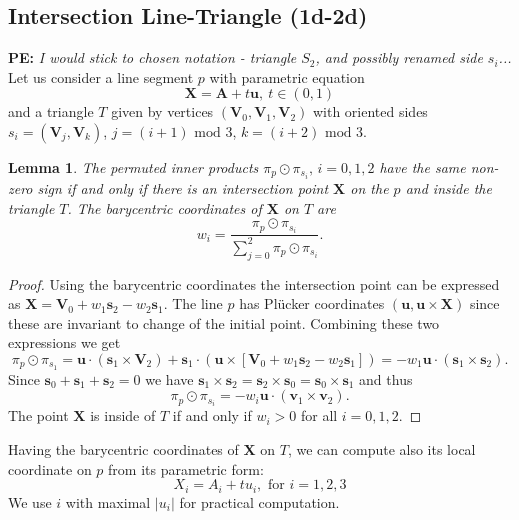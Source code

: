 \documentclass{elsarticle}
\newtheorem{lemma}[theorem]{Lemma}
\def\vc#1{\mathbf{\boldsymbol{#1}}}     %
\newcommand{\notePE}[1]{{\color{Orange} \textbf{PE: } \textit{#1}}}
\newcommand{\plucker}{Pl\"{u}cker }
\begin{document}

\subsection{Intersection Line-Triangle (1d-2d)}
\label{sec:1d-2d}
\notePE{I would stick to chosen notation - triangle $S_2$, and possibly renamed side $s_i$...}
Let us consider a line segment $p$ with parametric equation 
\begin{equation}
    \label{eq:line_parametric}
    \vc X = \vc A + t\vc u,\ t\in (0,1)
\end{equation}
and a triangle $T$ given by vertices $(\vc V_0, \vc V_1, \vc V_2)$ 
with oriented sides $s_i=(\vc V_j, \vc V_k)$, $j=(i+1)\text{ mod }3$, $k=(i+2)\text{ mod }3$. 
\begin{lemma}
The permuted inner products $\pi_p \odot \pi_{s_i},\, i=0,1,2$ have the same non-zero sign if and only if there
is an intersection point $\vc X$ on the $p$ and inside the triangle $T$. 
The barycentric coordinates of $\vc X$ on $T$ are
\begin{equation}
  \label{eq:bary_centric}
   w_i = \frac{\pi_p \odot \pi_{s_i}}{ \sum_{j=0}^{2} \pi_p \odot \pi_{s_i} }.
\end{equation}
\end{lemma}
\begin{proof}
Using the barycentric coordinates the intersection point can be expressed as $\vc X = \vc V_0 + w_1 \vc s_2 - w_2 \vc s_1$.
The line $p$ has \plucker coordinates $(\vc u, \vc u \times \vc X)$ since these are invariant to change of the initial point. 
Combining these two expressions we get
\[
   \pi_p \odot \pi_{s_1} = \vc u \cdot (\vc s_1 \times \vc V_2) + \vc s_1 \cdot ( \vc u \times [\vc V_0 + w_1\vc s_2 - w_2 \vc s_1])
   =-w_1 \vc u \cdot (\vc s_1 \times \vc s_2).
\]
Since $\vc s_0 + \vc s_1 + \vc s_2=0$ we have $ \vc s_1 \times \vc s_2 = \vc s_2 \times \vc s_0 = \vc s_0 \times \vc s_1$ and thus
\[
   \pi_p \odot \pi_{s_i} = -w_i \vc u \cdot (\vc v_1 \times \vc v_2).
\]
The point $\vc X$ is inside of $T$ if and only if $w_i>0$ for all $i=0,1,2$.
\end{proof}
Having the barycentric coordinates of $\vc X$ on $T$, we can compute also its local coordinate on $p$ from its parametric form:
\begin{equation}
   \label{eq:line}
   X_i  = A_i + t u_i, \text{ for } i=1,2,3
\end{equation}
We use $i$ with maximal $|u_i|$ for practical computation. 
\end{document}
